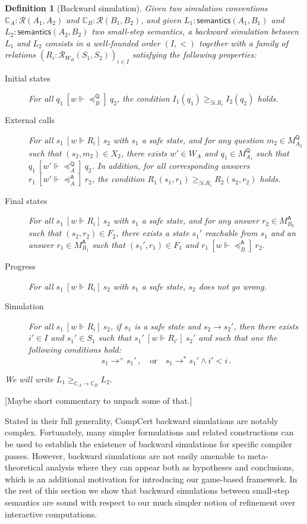 \documentclass{article}
\newtheorem{definition}{Definition}
\newcommand{\kw}[1]{\ensuremath{ \mathsf{#1} }}
\newcommand{\ifr}[1]{\ [{#1}]\ }
\begin{document}
\begin{definition}[Backward simulation]
Given
two simulation conventions
$\mathbb{C}_A : \mathcal{R}(A_1, A_2)$ and
$\mathbb{C}_B : \mathcal{R}(B_1, B_2)$,
and given
$L_1 : \kw{semantics}(A_1, B_1)$ and
$L_2 : \kw{semantics}(A_2, B_2)$
two small-step semantics,
a \emph{backward simulation} between $L_1$ and $L_2$
consists in a
well-founded order $(I, <)$
together with a family of relations
$(R_i : \mathcal{R}_{W_B}(S_1, S_2))_{i \in I}$
satisfying the following properties:
\begin{description}
\item[Initial states]
  For all
  $q_1 \ifr{w \Vdash {\preceq}_B^\kw{Q}} q_2$,
  the condition $I_1(q_1) \ge_{\exists i . R_i} I_2(q_2)$ holds.
\item[External calls]
  For all $s_1 \ifr{w \Vdash R_i} s_2$
  with $s_1$ a safe state, and
  for any question $m_2 \in M_{A_2}^\kw{Q}$
  such that $(s_2, m_2) \in X_2$,
  there exists $w' \in W_A$ and $q_1 \in M_{A_1}^\kw{Q}$
  such that $q_1 \ifr{w' \Vdash {\preceq}_A^\kw{Q}} q_2$.
  In addition, for all corresponding answers
  $r_1 \ifr{w' \Vdash {\preceq}_A^\kw{A}} r_2$,
  the condition $R_1(s_1, r_1) \ge_{\exists i . R_i} R_2(s_2, r_2)$ holds.
\item[Final states]
  For all $s_1 \ifr{w \Vdash R_i} s_2$
  with $s_1$ a safe state, and
  for any answer $r_2 \in M_{B_2}^\kw{A}$
  such that $(s_2, r_2) \in F_2$,
  there exists a state $s_1'$ reachable from $s_1$ and
  an answer $r_1 \in M_{B_1}^\kw{A}$ such that
  $(s_1', r_1) \in F_1$ and $r_1 \ifr{w \Vdash {\preceq}_B^\kw{A}} r_2$.
\item[Progress]
  For all $s_1 \ifr{w \Vdash R_i} s_2$
  with $s_1$ a safe state,
  $s_2$ does not go wrong.
\item[Simulation]
  For all $s_1 \ifr{w \Vdash R_i} s_2$,
  if $s_1$ is a safe state and $s_2 \rightarrow s_2'$,
  then there exists $i' \in I$ and $s_1' \in S_1$
  such that $s_1' \ifr{w \Vdash R_{i'}} s_2'$ and
  such that one the following conditions hold:
  \[
    s_1 \rightarrow^+ s_1' \,, \quad \mbox{or} \quad
    s_1 \rightarrow^* s_1' \wedge i' < i \,.
  \]
\end{description}
We will write $L_1 \ge_{\mathbb{C}_A \rightarrow \mathbb{C}_B} L_2$.
\end{definition}

[Maybe short commentary to unpack some of that.]

Stated in their full generality,
CompCert backward simulations are notably complex.
Fortunately,
many simpler formulations and related constructions
can be used to establish
the existence of backward simulations
for specific compiler passes.
However,
backward simulations are not easily amenable to
meta-theoretical analysis
where they can appear both as hypotheses and conclusions,
which is an additional motivation for introducing
our game-based framework.
In the rest of this section we show that
backward simulations between small-step semantics
are sound with respect to
our much simpler notion of refinement
over interactive computations.
\end{document}
